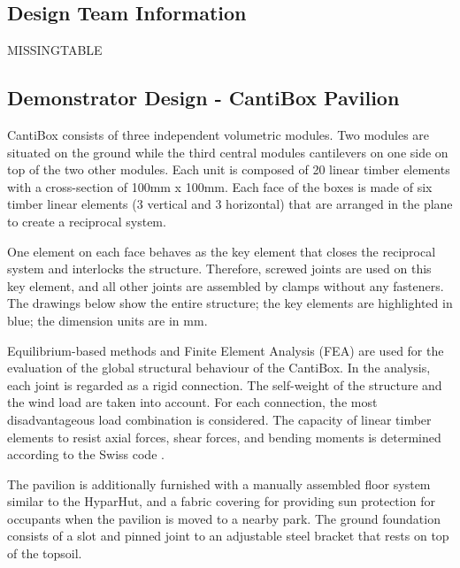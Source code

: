 \subsection{Design Team Information}
\label{subsection:exploration_5_design_team_information}

MISSINGTABLE

\subsection{Demonstrator Design - CantiBox Pavilion}
\label{subsection:exploration_5_demonstrator_design_cantibox_pavilion}

CantiBox consists of three independent volumetric modules. Two modules are situated on the ground while the third central modules cantilevers on one side on top of the two other modules. Each unit is composed of 20 linear timber elements with a cross-section of 100mm x 100mm. Each face of the boxes is made of six timber linear elements (3 vertical and 3 horizontal) that are arranged in the plane to create a reciprocal system. 




One element on each face behaves as the key element that closes the reciprocal system and interlocks the structure. Therefore, screwed joints are used on this key element, and all other joints are assembled by clamps without any fasteners. The drawings below show the entire structure; the key elements are highlighted in blue; the dimension units are in mm. 




Equilibrium-based methods and Finite Element Analysis (FEA) are used for the evaluation of the global structural behaviour of the CantiBox. In the analysis, each joint is regarded as a rigid connection. The self-weight of the structure and the wind load are taken into account. For each connection, the most disadvantageous load combination is considered. The capacity of linear timber elements to resist axial forces, shear forces, and bending moments is determined according to the Swiss code \parencite{swissstandardsassociationSIA265Timber2003}.

The pavilion is additionally furnished with a manually assembled floor system similar to the HyparHut, and a fabric covering for providing sun protection for occupants when the pavilion is moved to a nearby park. The ground foundation consists of a slot and pinned joint to an adjustable steel bracket that rests on top of the topsoil.

